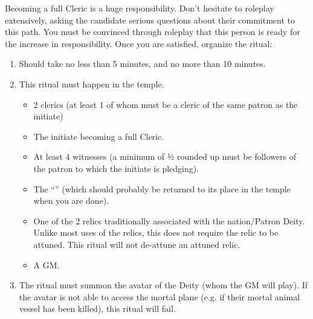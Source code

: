 \documentclass[green]{GL2020}
\begin{document}
Becoming a full Cleric is a huge responsibility. Don’t hesitate to roleplay extensively, asking the candidate serious questions about their commitment to this path. You must be convinced through roleplay that this person is ready for the increase in responsibility. Once you are satisfied, organize the ritual:
  \begin{enumerate}
    \item Should take no less than 5 minutes, and no more than 10 minutes.
    \item This ritual must happen in the temple.
    \begin{itemize}
      \item 2 clerics (at least 1 of whom must be a cleric of the same patron as the initiate)
      \item The initiate becoming a full Cleric.
      \item At least 4 witnesses (a minimum of ½ rounded up must be followers of the patron to which the initiate is pledging).
      \item The ``\iOakStaff{}'' (which should probably be returned to its place in the temple when you are done).
      \item One of the 2 relics traditionally associated with the nation/Patron Deity.  Unlike most uses of the relics, this does not require the relic to be attuned. This ritual will not de-attune an attuned relic.
      \item A GM.
    \end{itemize}
    \item The ritual must summon the avatar of the Deity (whom the GM will play). If the avatar is not able to access the mortal plane (e.g. if their mortal animal vessel has been killed), this ritual will fail. 
  \end{enumerate}
   
\end{document}
